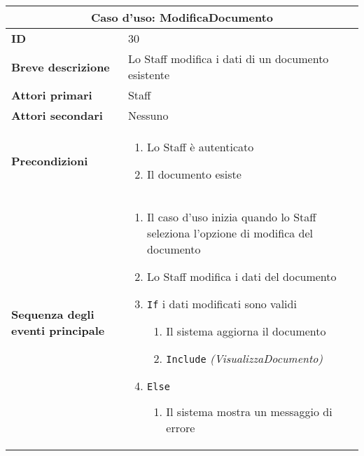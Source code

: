 \documentclass[a4paper]{report}
\begin{document}
\clearpage
\begin{table}[H]
\vspace*{-0cm}
\renewcommand{\arraystretch}{1.9}
\begin{tabular}{|p{3.9cm}|p{9.9cm}|}
\hline
\multicolumn{2}{|c|}{\textbf{Caso d’uso: ModificaDocumento}} \\ \hline
	\textbf{ID} & 30 \\ \hline
	\textbf{Breve descrizione} & Lo Staff modifica i dati di un documento esistente \\ \hline
	\textbf{Attori primari} & Staff \\ \hline
	\textbf{Attori secondari} & Nessuno \\ \hline
	\textbf{Precondizioni} & \begin{enumerate}[leftmargin=14pt,label=\arabic*.,labelsep=0.5em,topsep=0pt,partopsep=0pt,parsep=0pt,itemsep=0pt]
        \item Lo Staff è autenticato
        \item Il documento esiste
    \end{enumerate} \\ \hline
	\textbf{Sequenza degli eventi principale} & 
    \begin{enumerate}[leftmargin=14pt,label=\arabic*.,labelsep=0.5em,topsep=0pt,partopsep=0pt,parsep=0pt,itemsep=0pt]
        \item Il caso d’uso inizia quando lo Staff seleziona l'opzione di modifica del documento
        \item Lo Staff modifica i dati del documento
        \item \texttt{If} i dati modificati sono validi
        \begin{enumerate}[label=\arabic{enumi}.\arabic*.,leftmargin=22pt,labelsep=0.5em,topsep=0pt,partopsep=0pt,parsep=0pt,itemsep=0pt]
            \item Il sistema aggiorna il documento
            \item \texttt{Include} \textit{(VisualizzaDocumento)}
        \end{enumerate}
        \item \texttt{Else}
        \begin{enumerate}[label=\arabic{enumi}.\arabic*.,leftmargin=22pt,labelsep=0.5em,topsep=0pt,partopsep=0pt,parsep=0pt,itemsep=0pt]
            \item Il sistema mostra un messaggio di errore
        \end{enumerate}
    \end{enumerate}\\ \hline

\end{tabular}
\end{table}
\end{document}
